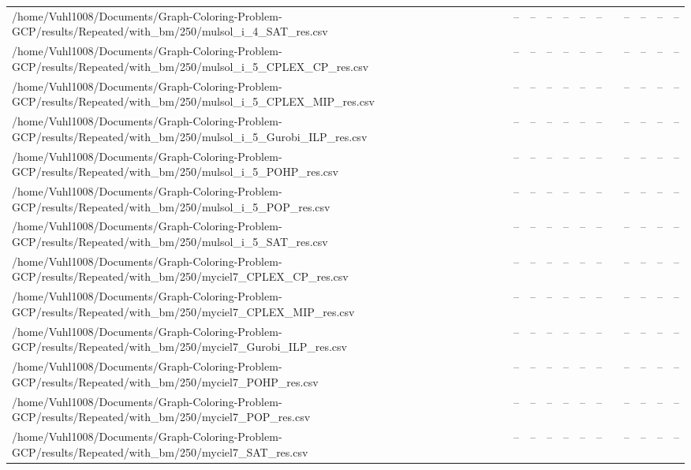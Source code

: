 \begin{table}[htbp]
\begin{tabular}{llllllllllll}
/home/Vuhl1008/Documents/Graph-Coloring-Problem-GCP/results/Repeated/with\_bm/250/mulsol\_i\_4\_SAT\_res.csv & -- & -- & -- & -- & -- & -- & {} & -- & -- & -- & -- \\
/home/Vuhl1008/Documents/Graph-Coloring-Problem-GCP/results/Repeated/with\_bm/250/mulsol\_i\_5\_CPLEX\_CP\_res.csv & -- & -- & -- & -- & -- & -- & {} & -- & -- & -- & -- \\
/home/Vuhl1008/Documents/Graph-Coloring-Problem-GCP/results/Repeated/with\_bm/250/mulsol\_i\_5\_CPLEX\_MIP\_res.csv & -- & -- & -- & -- & -- & -- & {} & -- & -- & -- & -- \\
/home/Vuhl1008/Documents/Graph-Coloring-Problem-GCP/results/Repeated/with\_bm/250/mulsol\_i\_5\_Gurobi\_ILP\_res.csv & -- & -- & -- & -- & -- & -- & {} & -- & -- & -- & -- \\
/home/Vuhl1008/Documents/Graph-Coloring-Problem-GCP/results/Repeated/with\_bm/250/mulsol\_i\_5\_POHP\_res.csv & -- & -- & -- & -- & -- & -- & {} & -- & -- & -- & -- \\
/home/Vuhl1008/Documents/Graph-Coloring-Problem-GCP/results/Repeated/with\_bm/250/mulsol\_i\_5\_POP\_res.csv & -- & -- & -- & -- & -- & -- & {} & -- & -- & -- & -- \\
/home/Vuhl1008/Documents/Graph-Coloring-Problem-GCP/results/Repeated/with\_bm/250/mulsol\_i\_5\_SAT\_res.csv & -- & -- & -- & -- & -- & -- & {} & -- & -- & -- & -- \\
/home/Vuhl1008/Documents/Graph-Coloring-Problem-GCP/results/Repeated/with\_bm/250/myciel7\_CPLEX\_CP\_res.csv & -- & -- & -- & -- & -- & -- & {} & -- & -- & -- & -- \\
/home/Vuhl1008/Documents/Graph-Coloring-Problem-GCP/results/Repeated/with\_bm/250/myciel7\_CPLEX\_MIP\_res.csv & -- & -- & -- & -- & -- & -- & {} & -- & -- & -- & -- \\
/home/Vuhl1008/Documents/Graph-Coloring-Problem-GCP/results/Repeated/with\_bm/250/myciel7\_Gurobi\_ILP\_res.csv & -- & -- & -- & -- & -- & -- & {} & -- & -- & -- & -- \\
/home/Vuhl1008/Documents/Graph-Coloring-Problem-GCP/results/Repeated/with\_bm/250/myciel7\_POHP\_res.csv & -- & -- & -- & -- & -- & -- & {} & -- & -- & -- & -- \\
/home/Vuhl1008/Documents/Graph-Coloring-Problem-GCP/results/Repeated/with\_bm/250/myciel7\_POP\_res.csv & -- & -- & -- & -- & -- & -- & {} & -- & -- & -- & -- \\
/home/Vuhl1008/Documents/Graph-Coloring-Problem-GCP/results/Repeated/with\_bm/250/myciel7\_SAT\_res.csv & -- & -- & -- & -- & -- & -- & {} & -- & -- & -- & -- \\

\end{tabular}
\end{table}
